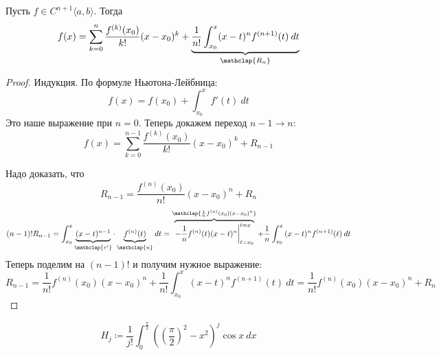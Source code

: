 \begin{theorem}
    Пусть $f \in C^{n + 1}\langle a, b \rangle$. Тогда
    \begin{equation*}
    f(x) =
    \sum_{k = 0}^{n} \frac{f^{(k)}(x_0)}{k!}(x - x_0)^k +
    \underbrace{\frac{1}{n!}\int_{x_0}^{x} (x - t)^n f^{(n + 1)}(t) \: dt}_{\mathclap{R_n}}
    \end{equation*}
\end{theorem}
\begin{proof}
    Индукция. По формуле Ньютона-Лейбница:
    \begin{equation*}
      f(x) = f(x_0) + \int_{x_0}^{x} f'(t) \: dt
    \end{equation*}
    Это наше выражение при $n = 0$. Теперь докажем переход $n - 1 \to n$:
    \begin{equation*}
      f(x) = \sum_{k = 0}^{n - 1} \frac{f^{(k)}(x_0)}{k!}(x - x_0)^{k} + R_{n - 1}
    \end{equation*}

    Надо доказать, что
    \begin{equation*}
      R_{n - 1} = \frac{f^{(n)}(x_0)}{n!}(x - x_0)^n + R_n
    \end{equation*}
    \begin{equation*}
      (n - 1)!R_{n - 1} =
      \int_{{x_0}}^{{x}} {\underbrace{(x - t)^{n - 1}}_{\mathclap{v'}}\cdot \underbrace{f^{(n)}(t)}_{\mathclap{u}}} \: d{t} =
      \overbrace{\left.-\frac{1}{n}f^{(n)}(t)(x - t)^n\right|_{t = x_0}^{t = x}}^{\mathclap{\frac{1}{n}f^{(n)}(x_0)(x - x_0)^n}}
      + \frac{1}{n} \int_{{x_0}}^{{x}} {(x - t)^n f^{(n + 1)}(t)} \: d{t}
    \end{equation*}
    Теперь поделим на $(n - 1)!$ и получим нужное выражение:
    \begin{equation*}
      R_{n - 1} =
      \frac{1}{n!}f^{(n)}(x_0)(x - x_0)^{n} +
      \frac{1}{n!} \int_{{x_0}}^{{x}} {(x - t)^n f^{(n + 1)}(t)} \: d{t}
      =
      \frac{1}{n!}f^{(n)}(x_0)(x - x_0)^{n} +
      R_n
    \end{equation*}
\end{proof}

\begin{example}
  \begin{equation*}
    H_j \coloneqq \frac{1}{j!}\int_{0}^{\frac{\pi}{2}}\left(\left(\frac{\pi}{2}\right)^2 - x^2\right)^j \cos x \: dx
  \end{equation*}
\end{example}

